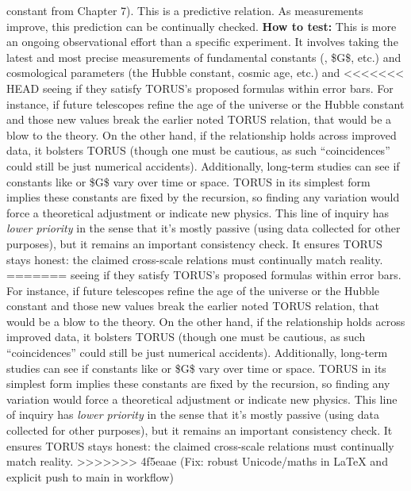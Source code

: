 \documentclass[]{article}
\begin{document}
\begin{itemize}
  constant \alpha from Chapter 7). This is a predictive relation. As
  measurements improve, this prediction can be continually checked.
  \textbf{How to test:} This is more an ongoing observational effort
  than a specific experiment. It involves taking the latest and most
  precise measurements of fundamental constants (\alpha, \$G\$, etc.) and
  cosmological parameters (the Hubble constant, cosmic age, etc.) and
<<<<<<< HEAD
  seeing if they satisfy TORUS's proposed formulas within error
  bars\hspace{0pt}. For instance, if future telescopes refine the age of
  the universe or the Hubble constant and those new values break the
  earlier noted TORUS relation, that would be a blow to the theory. On
  the other hand, if the relationship holds across improved data, it
  bolsters TORUS (though one must be cautious, as such ``coincidences''
  could still be just numerical accidents). Additionally, long-term
  studies can see if constants like \alpha or \$G\$ vary over time or space.
  TORUS in its simplest form implies these constants are fixed by the
  recursion, so finding any variation would force a theoretical
  adjustment or indicate new physics. This line of inquiry has
  \emph{lower priority} in the sense that it's mostly passive (using
  data collected for other purposes)\hspace{0pt}, but it remains an
  important consistency check. It ensures TORUS stays honest: the
  claimed cross-scale relations must continually match reality.
=======
  seeing if they satisfy TORUS's proposed formulas within error bars​.
  For instance, if future telescopes refine the age of the universe or
  the Hubble constant and those new values break the earlier noted TORUS
  relation, that would be a blow to the theory. On the other hand, if
  the relationship holds across improved data, it bolsters TORUS (though
  one must be cautious, as such ``coincidences'' could still be just
  numerical accidents). Additionally, long-term studies can see if
  constants like \alpha or \$G\$ vary over time or space. TORUS in its
  simplest form implies these constants are fixed by the recursion, so
  finding any variation would force a theoretical adjustment or indicate
  new physics. This line of inquiry has \emph{lower priority} in the
  sense that it's mostly passive (using data collected for other
  purposes)​, but it remains an important consistency check. It ensures
  TORUS stays honest: the claimed cross-scale relations must continually
  match reality.
>>>>>>> 4f5eaae (Fix: robust Unicode/maths in LaTeX and explicit push to main in workflow)
\end{itemize}
\end{document}
